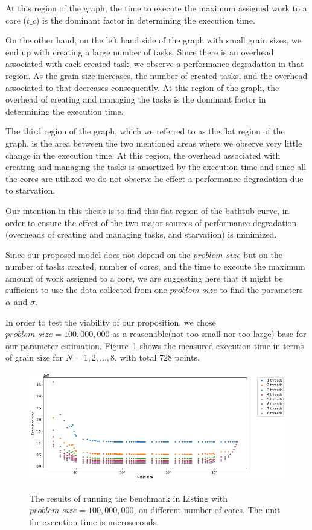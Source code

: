 At this region of the graph, the time to execute the maximum assigned work to a core ($t\_c$) is the dominant factor in determining the execution time.   

On the other hand, on the left hand side of the graph with small grain sizes, we end up with creating a large number of tasks. Since there is an overhead associated with each created task, we observe a performance degradation in that region. As the grain size increases, the number of created tasks, and the overhead associated to that decreases consequently. At this region of the graph, the overhead of creating and managing the tasks is the dominant factor in determining the execution time.   

The third region of the graph, which we referred to as the flat region of the graph, is the area between the two mentioned areas where we observe very little change in the execution time. At this region, the overhead associated with creating and managing the tasks is amortized by the execution time and since all the cores are utilized we do not observe he effect a performance degradation due to starvation.

Our intention in this thesis is to find this flat region of the bathtub curve, in order to ensure the effect of the two major sources of performance degradation (overheads of creating and managing tasks, and starvation) is minimized.

Since our proposed model does not depend on the $problem\_{size}$ but on the number of tasks created, number of cores, and the time to execute the maximum amount of work assigned to a core, we are suggesting here that it might be sufficient to use the data collected from one $problem\_{size}$ to find the parameters $\alpha$ and $\sigma$. 

In order to test the viability of our proposition, we chose $problem\_{size}=100,000,000$ as a reasonable(not too small nor too large) base for our parameter estimation. Figure~\ref{fig42} shows the measured execution time in terms of grain size for $N=1,2,...,8$, with total $728$ points.
 
\begin{figure}[H]
	\centering
	{\includegraphics[scale=.45]{images/hpx_for_loop/100000000_8.png}}
	\caption{The results of running the benchmark in Listing with $problem\_size=100,000,000$, on different number of cores. The unit for execution time is microseconds.}\label{fig42}		
\end{figure}

